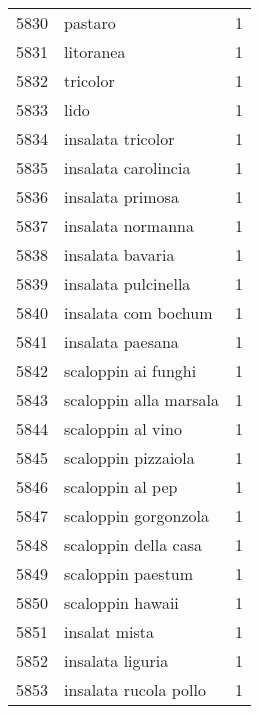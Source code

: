 \begin{tabular}{llr}
5830 &                                            pastaro &      1 \\
5831 &                                          litoranea &      1 \\
5832 &                                           tricolor &      1 \\
5833 &                                               lido &      1 \\
5834 &                                  insalata tricolor &      1 \\
5835 &                                insalata carolincia &      1 \\
5836 &                                   insalata primosa &      1 \\
5837 &                                  insalata normanna &      1 \\
5838 &                                   insalata bavaria &      1 \\
5839 &                                insalata pulcinella &      1 \\
5840 &                                insalata com bochum &      1 \\
5841 &                                   insalata paesana &      1 \\
5842 &                                scaloppin ai funghi &      1 \\
5843 &                             scaloppin alla marsala &      1 \\
5844 &                                  scaloppin al vino &      1 \\
5845 &                                scaloppin pizzaiola &      1 \\
5846 &                                   scaloppin al pep &      1 \\
5847 &                               scaloppin gorgonzola &      1 \\
5848 &                               scaloppin della casa &      1 \\
5849 &                                  scaloppin paestum &      1 \\
5850 &                                   scaloppin hawaii &      1 \\
5851 &                                      insalat mista &      1 \\
5852 &                                   insalata liguria &      1 \\
5853 &                              insalata rucola pollo &      1 \\

\end{tabular}
